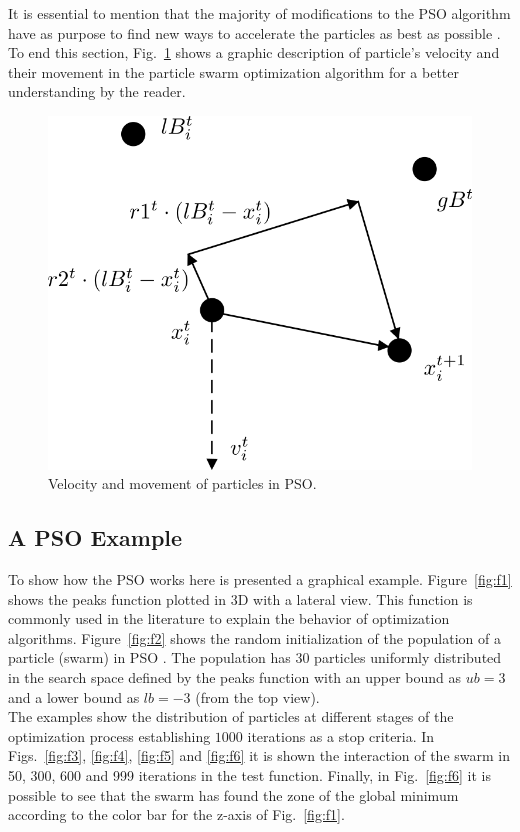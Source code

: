 It is essential to mention that the majority of modifications to the PSO algorithm have as purpose to find new ways to accelerate the particles as best as possible \cite{erick2016optimizacion}. To end this section, Fig.~\ref{fig:PSOmovement} shows a graphic description of particle's velocity and their movement in the particle swarm optimization algorithm for a better understanding by the reader.\\

\begin{figure}[h!]
\centering
\includegraphics[scale=0.4]{"Part 2 - Search-Based Optimization/Particle Swarm Optimization/Images/Fig.1.3.png"}
\caption{Velocity and movement of particles in PSO.}
\label{fig:PSOmovement}
\end{figure}

\subsection{A PSO Example}

To show how the PSO works here is presented a graphical example. Figure~\ref{fig:f1} shows the peaks function plotted in 3D with a lateral view. This function is commonly used in the literature to explain the behavior of optimization algorithms. Figure~\ref{fig:f2} shows the random initialization of the population of a particle (swarm) in PSO \cite{kennedy1995particle}. The population has 30 particles uniformly distributed in the search space defined by the peaks function with an upper bound as $ub=3$ and a lower bound as $lb=-3$ (from the top view).\\
The examples show the distribution of particles at different stages of the optimization process establishing $1000$ iterations as a stop criteria. In Figs.~\ref{fig:f3}, \ref{fig:f4}, \ref{fig:f5} and \ref{fig:f6} it is shown the interaction of the swarm in 50, 300, 600 and 999 iterations in the test function. Finally, in Fig.~\ref{fig:f6} it is possible to see that the swarm has found the zone of the global minimum according to the color bar for the z-axis of Fig.~\ref{fig:f1}.

